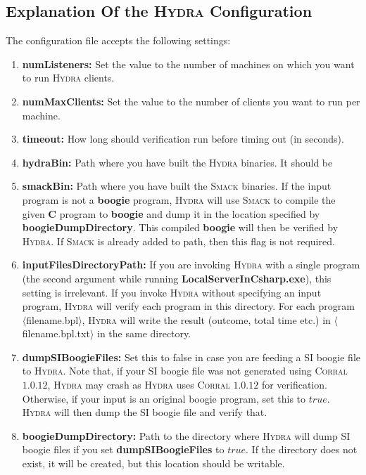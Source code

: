 \documentclass{article}
\begin{document}
\subsection{Explanation Of the \textsc{Hydra} Configuration}
The configuration file accepts the following settings:
\begin{enumerate}
  \item \textbf{numListeners:} Set the value to the number of machines on which you want to run \textsc{Hydra} clients.
  \item \textbf{numMaxClients:} Set the value to the number of clients you want to run per machine.
  \item \textbf{timeout:} How long should verification run before timing out (in seconds).
  \item \textbf{hydraBin:} Path where you have built the \textsc{Hydra} binaries. It should be
  \par
  \noindent
  \item \textbf{smackBin:} Path where you have built the \textsc{Smack} binaries. If the input program is not a \textbf{boogie} program, \textsc{Hydra} will use \textsc{Smack} to compile the given \textbf{C} program to \textbf{boogie} and dump it in the location specified by \textbf{boogieDumpDirectory}. This compiled \textbf{boogie} will then be verified by \textsc{Hydra}. If \textsc{Smack} is already added to path, then this flag is not required.
  \item \textbf{inputFilesDirectoryPath:} If you are invoking \textsc{Hydra} with a single program (the second argument while running \textbf{LocalServerInCsharp.exe}), this setting is irrelevant. If you invoke \textsc{Hydra} without specifying an input program, \textsc{Hydra} will verify each program in this directory. For each program  $\langle$filename.bpl$\rangle$, \textsc{Hydra} will write the result (outcome, total time etc.) in $\langle$filename.bpl.txt$\rangle$ in the same
      directory.
  \item \textbf{dumpSIBoogieFiles:} Set this to false in case you are feeding a SI boogie file to \textsc{Hydra}. Note that, if your SI boogie file was not generated using \textsc{Corral} $1.0.12$, \textsc{Hydra} may crash as \textsc{Hydra} uses \textsc{Corral} $1.0.12$ for verification. Otherwise, if your input is an original boogie program, set this to $true$. \textsc{Hydra} will then dump the SI boogie file and verify that.
  \item \textbf{boogieDumpDirectory:} Path to the directory where \textsc{Hydra} will dump SI boogie files if you set \textbf{dumpSIBoogieFiles} to $true$. If the directory does not exist, it will be created, but this location should be writable.

\end{enumerate}
\end{document}
